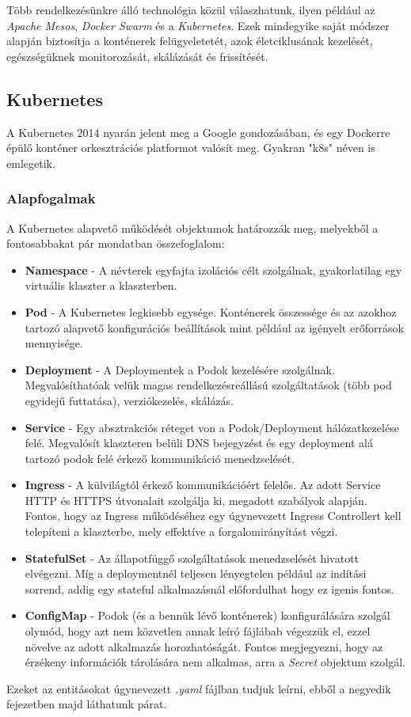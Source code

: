 Több rendelkezésünkre álló technológia közül válaszhatunk, ilyen például az \textit{Apache Mesos}, \textit{Docker Swarm} és a \textit{Kubernetes}. Ezek mindegyike saját módszer alapján biztosítja a konténerek felügyeletetét, azok életciklusának kezelését, egészségüknek monitorozását, skálázását és frissítését.
\subsection{Kubernetes}
A Kubernetes 2014 nyarán jelent meg a Google gondozásában, és egy Dockerre épülő konténer orkesztrációs platformot valósít meg. Gyakran "k8s" néven is emlegetik.
\subsubsection{Alapfogalmak}
A Kubernetes alapvető működését objektumok határozzák meg, melyekből a fontosabbakat pár mondatban összefoglalom\cite{k8s}:
\begin{itemize}
    \item \textbf{Namespace} - A névterek egyfajta izolációs célt szolgálnak, gyakorlatilag egy virtuális klaszter a klaszterben.
    \item \textbf{Pod} - A Kubernetes legkisebb egysége. Konténerek összessége és az azokhoz tartozó alapvető konfigurációs beállítások mint például az igényelt erőforrások mennyisége.
    \item \textbf{Deployment} - A Deploymentek a Podok kezelésére szolgálnak. Megvalósíthatóak velük magas rendelkezésreállású szolgáltatások (több pod egyidejű futtatása), verziókezelés, skálázás.
    \item \textbf{Service} - Egy absztrakciós réteget von a Podok/Deployment hálózatkezelése felé. Megvalósít klaszteren belüli DNS bejegyzést és egy deployment alá tartozó podok felé érkező kommunikáció menedzselését.
    \item \textbf{Ingress} - A külvilágtól érkező kommunikációért felelős. Az adott Service HTTP és HTTPS útvonalait szolgálja ki, megadott szabályok alapján. Fontos, hogy az Ingress működéséhez egy úgynevezett Ingress Controllert kell telepíteni a klaszterbe, mely effektíve a forgalomirányítást végzi.
    \item \textbf{StatefulSet} - Az állapotfüggő szolgáltatások menedzselését hivatott elvégezni. Míg a deploymentnél teljesen lényegtelen például az indítási sorrend, addig egy stateful alkalmazásnál előfordulhat hogy ez igenis fontos.
    \item \textbf{ConfigMap} - Podok (és a bennük lévő konténerek) konfigurálására szolgál olymód, hogy azt nem közvetlen annak leíró fájlábab végezzük el, ezzel növelve az adott alkalmazás horozhatóságát. Fontos megjegyezni, hogy az érzékeny információk tárolására nem alkalmas, arra a \textit{Secret} objektum szolgál.
\end{itemize}
Ezeket az entitásokat úgynevezett \textit{.yaml} fájlban tudjuk leírni, ebből a negyedik fejezetben majd láthatunk párat.
